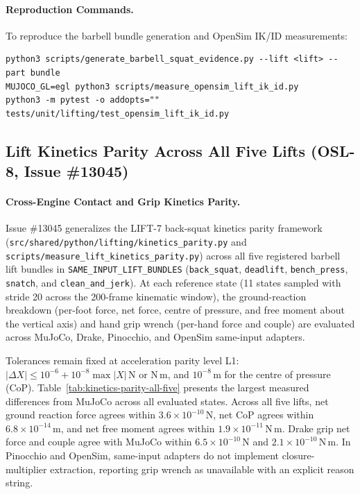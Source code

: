 \documentclass[11pt,a4paper]{article}
\begin{document}
\paragraph{Reproduction Commands.}
To reproduce the barbell bundle generation and OpenSim IK/ID measurements:
\begin{verbatim}
python3 scripts/generate_barbell_squat_evidence.py --lift <lift> --part bundle
MUJOCO_GL=egl python3 scripts/measure_opensim_lift_ik_id.py
python3 -m pytest -o addopts="" tests/unit/lifting/test_opensim_lift_ik_id.py
\end{verbatim}

\subsection{Lift Kinetics Parity Across All Five Lifts (OSL-8, Issue \#13045)}\label{sec:lift-kinetics-parity-all-five}
\paragraph{Cross-Engine Contact and Grip Kinetics Parity.}
Issue \#13045 generalizes the LIFT-7 back-squat kinetics parity framework (\texttt{src/shared/python/lifting/kinetics\_parity.py} and \texttt{scripts/measure\_lift\_kinetics\_parity.py}) across all five registered barbell lift bundles in \texttt{SAME\_INPUT\_LIFT\_BUNDLES} (\texttt{back\_squat}, \texttt{deadlift}, \texttt{bench\_press}, \texttt{snatch}, and \texttt{clean\_and\_jerk}).
At each reference state (11 states sampled with stride 20 across the 200-frame kinematic window), the ground-reaction breakdown (per-foot force, net force, centre of pressure, and free moment about the vertical axis) and hand grip wrench (per-hand force and couple) are evaluated across MuJoCo, Drake, Pinocchio, and OpenSim same-input adapters.

Tolerances remain fixed at acceleration parity level L1: $|\Delta X| \le 10^{-6} + 10^{-8} \max |X|$\,N or N\,m, and $10^{-8}$\,m for the centre of pressure (CoP).
Table~\ref{tab:kinetics-parity-all-five} presents the largest measured differences from MuJoCo across all evaluated states. Across all five lifts, net ground reaction force agrees within $3.6\times 10^{-10}$\,N, net CoP agrees within $6.8\times 10^{-14}$\,m, and net free moment agrees within $1.9\times 10^{-11}$\,N\,m. Drake grip net force and couple agree with MuJoCo within $6.5\times 10^{-10}$\,N and $2.1\times 10^{-10}$\,N\,m. In Pinocchio and OpenSim, same-input adapters do not implement closure-multiplier extraction, reporting grip wrench as unavailable with an explicit reason string.
\end{document}
